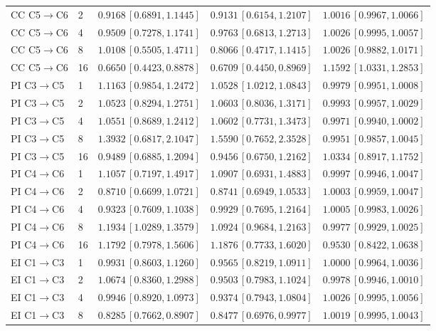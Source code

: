 \begin{table}[p]
\begin{tabular*}{\linewidth}{@{\extracolsep{\fill}}llrrr@{}}
CC C5$\to$C6 & 2 & $0.9168\,[0.6891,1.1445]$ & $0.9131\,[0.6154,1.2107]$ & $1.0016\,[0.9967,1.0066]$\\
CC C5$\to$C6 & 4 & $0.9509\,[0.7278,1.1741]$ & $0.9763\,[0.6813,1.2713]$ & $1.0026\,[0.9995,1.0057]$\\
CC C5$\to$C6 & 8 & $1.0108\,[0.5505,1.4711]$ & $0.8066\,[0.4717,1.1415]$ & $1.0026\,[0.9882,1.0171]$\\
CC C5$\to$C6 & 16 & $0.6650\,[0.4423,0.8878]$ & $0.6709\,[0.4450,0.8969]$ & $1.1592\,[1.0331,1.2853]$\\
\midrule
PI C3$\to$C5 & 1 & $1.1163\,[0.9854,1.2472]$ & $1.0528\,[1.0212,1.0843]$ & $0.9979\,[0.9951,1.0008]$\\
PI C3$\to$C5 & 2 & $1.0523\,[0.8294,1.2751]$ & $1.0603\,[0.8036,1.3171]$ & $0.9993\,[0.9957,1.0029]$\\
PI C3$\to$C5 & 4 & $1.0551\,[0.8689,1.2412]$ & $1.0602\,[0.7731,1.3473]$ & $0.9971\,[0.9940,1.0002]$\\
PI C3$\to$C5 & 8 & $1.3932\,[0.6817,2.1047]$ & $1.5590\,[0.7652,2.3528]$ & $0.9951\,[0.9857,1.0045]$\\
PI C3$\to$C5 & 16 & $0.9489\,[0.6885,1.2094]$ & $0.9456\,[0.6750,1.2162]$ & $1.0334\,[0.8917,1.1752]$\\
\midrule
PI C4$\to$C6 & 1 & $1.1057\,[0.7197,1.4917]$ & $1.0907\,[0.6931,1.4883]$ & $0.9997\,[0.9946,1.0047]$\\
PI C4$\to$C6 & 2 & $0.8710\,[0.6699,1.0721]$ & $0.8741\,[0.6949,1.0533]$ & $1.0003\,[0.9959,1.0047]$\\
PI C4$\to$C6 & 4 & $0.9323\,[0.7609,1.1038]$ & $0.9929\,[0.7695,1.2164]$ & $1.0005\,[0.9983,1.0026]$\\
PI C4$\to$C6 & 8 & $1.1934\,[1.0289,1.3579]$ & $1.0924\,[0.9684,1.2163]$ & $0.9977\,[0.9929,1.0025]$\\
PI C4$\to$C6 & 16 & $1.1792\,[0.7978,1.5606]$ & $1.1876\,[0.7733,1.6020]$ & $0.9530\,[0.8422,1.0638]$\\
\midrule
EI C1$\to$C3 & 1 & $0.9931\,[0.8603,1.1260]$ & $0.9565\,[0.8219,1.0911]$ & $1.0000\,[0.9964,1.0036]$\\
EI C1$\to$C3 & 2 & $1.0674\,[0.8360,1.2988]$ & $0.9503\,[0.7983,1.1024]$ & $0.9978\,[0.9946,1.0010]$\\
EI C1$\to$C3 & 4 & $0.9946\,[0.8920,1.0973]$ & $0.9374\,[0.7943,1.0804]$ & $1.0026\,[0.9995,1.0056]$\\
EI C1$\to$C3 & 8 & $0.8285\,[0.7662,0.8907]$ & $0.8477\,[0.6976,0.9977]$ & $1.0019\,[0.9995,1.0043]$\\

\end{tabular*}
\end{table}

